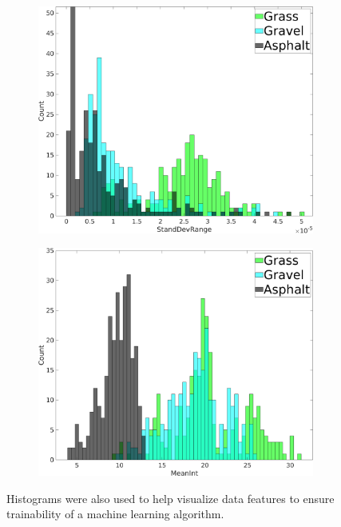 \documentclass[numbered,pdftex]{ohio-etd}
\begin{document}
{{{		\begin{figure}[H]
			\centering
			\begin{subfigure}{0.45\textwidth}
				\centering
				\includegraphics[width=1.0\linewidth]{Defense_Images/Ransac_Histogram_example_1}
				\caption[Feature Histogram Example 1]{}
				\label{fig:Ransac_Histogram_example_1}
			\end{subfigure}
			\begin{subfigure}{0.45\textwidth}
				\centering
				\includegraphics[width=1.0\linewidth]{Defense_Images/Ransac_Histogram_example_2}
				\caption[Feature Histogram Example 2]{}
				\label{fig:Ransac_Histogram_example_2}
			\end{subfigure}
			\caption[Feature Histograms]{Histograms were also used to help visualize data features to ensure trainability of a machine learning algorithm.}
			\label{fig:ransac_two_histograms}
		\end{figure}
	
}}}
\end{document}
